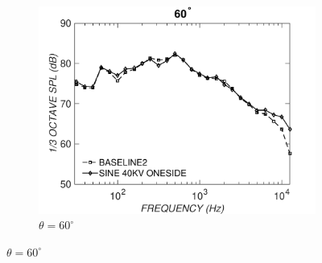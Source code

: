 \begin{figure}
\begin{subfigure}{0.32\textwidth}
\includegraphics[width=\linewidth]{figures/octave602}
\caption{$\theta=60^\circ$}
\label{fig:octave602}
\end{subfigure}%


\end{figure}
